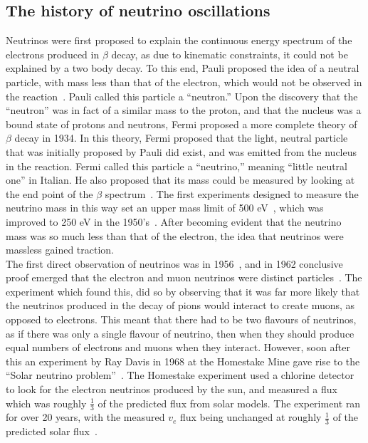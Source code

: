 \subsection{The history of neutrino oscillations} \label{Neut_Hist}
Neutrinos were first proposed to explain the continuous energy spectrum of the electrons produced in $\beta$ decay, as due to kinematic constraints, it could not be explained by a two body decay. To this end, Pauli proposed the idea of a neutral particle, with mass less than that of the electron, which would not be observed in the reaction~\citep{Pauli}. Pauli called this particle a ``neutron.'' Upon the discovery that the ``neutron'' was in fact of a similar mass to the proton, and that the nucleus was a bound state of protons and neutrons, Fermi proposed a more complete theory of $\beta$ decay in 1934. In this theory, Fermi proposed that the light, neutral particle that was initially proposed by Pauli did exist, and was emitted from the nucleus in the reaction. Fermi called this particle a ``neutrino,'' meaning ``little neutral one'' in Italian. He also proposed that its mass could be measured by looking at the end point of the $\beta$ spectrum~\citep{Fermi:1934hr}. The first experiments designed to measure the neutrino mass in this way set an upper mass limit of 500 eV~\citep{NeutMassLim1, NeutMassLim2}, which was improved to 250 eV in the 1950's~\citep{NeutMassLim3}. After becoming evident that the neutrino mass was so much less than that of the electron, the idea that neutrinos were massless gained traction. \\

The first direct observation of neutrinos was in 1956~\citep{Cowan:1992xc}, and in 1962 conclusive proof emerged that the electron and muon neutrinos were distinct particles~\citep{PhysRevLett.9.36}. The experiment which found this, did so by observing that it was far more likely that the neutrinos produced in the decay of pions would interact to create muons, as opposed to electrons. This meant that there had to be two flavours of neutrinos, as if there was only a single flavour of neutrino, then when they should produce equal numbers of electrons and muons when they interact. However, soon after this an experiment by Ray Davis in 1968 at the Homestake Mine gave rise to the ``Solar neutrino problem''~\citep{RayDavis1968}. The Homestake experiment used a chlorine detector to look for the electron neutrinos produced by the sun, and measured a flux which was roughly $\frac{1}{3}$ of the predicted flux from solar models. The experiment ran for over 20 years, with the measured $v_{e}$ flux being unchanged at roughly $\frac{1}{3}$ of the predicted solar flux~\citep{RayDavis1988}. \\

